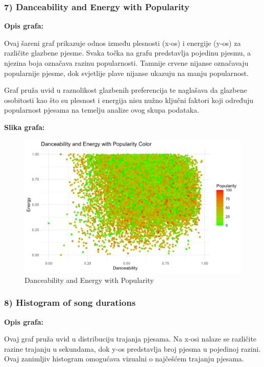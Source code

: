	
		\subsubsection{7) Danceability and Energy with Popularity}
	
	\textbf{Opis grafa:}
	
	Ovaj šareni graf prikazuje odnos između plesnosti (x-os) i energije (y-os) za različite glazbene pjesme. Svaka točka na grafu predstavlja pojedinu pjesmu, a njezina boja označava razinu popularnosti. Tamnije crvene nijanse označavaju popularnije pjesme, dok svjetlije plave nijanse ukazuju na manju popularnost.
	
	Graf pruža uvid u raznolikost glazbenih preferencija te naglašava da glazbene osobitosti kao što su plesnost i energija nisu nužno ključni faktori koji određuju popularnost pjesama na temelju analize ovog skupa podataka.
	
	\textbf{Slika grafa:}
	\begin{figure}[H]
		\includegraphics[scale=0.9]{slike/Dance-Energy-popularity.png}
		\centering
		\caption{ Danceability and Energy with Popularity}
		
	\end{figure}


	\subsubsection{8) Histogram of song durations}
    
    \textbf{Opis grafa:}
    
Ovaj graf pruža uvid u distribuciju trajanja pjesama. Na x-osi nalaze se različite razine trajanju u sekundama, dok y-os predstavlja broj pjesma u pojedinoj razini. Ovaj zanimljiv histogram omogućava vizualni o najčešćem trajanju pjesama.
    


